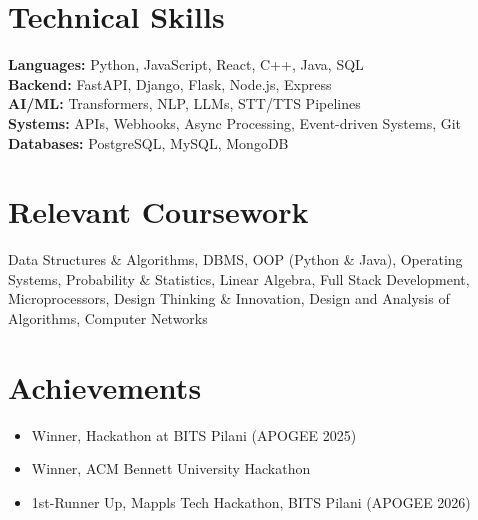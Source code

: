 \documentclass[a4paper,9pt]{article}
\begin{document}
\section*{Technical Skills}

\textbf{Languages:} Python, JavaScript, React, C++, Java, SQL \\
\textbf{Backend:} FastAPI, Django, Flask, Node.js, Express \\
\textbf{AI/ML:} Transformers, NLP, LLMs, STT/TTS Pipelines \\
\textbf{Systems:} APIs, Webhooks, Async Processing, Event-driven Systems, Git \\
\textbf{Databases:} PostgreSQL, MySQL, MongoDB \\

\vspace{5pt}

\section*{Relevant Coursework}

Data Structures \& Algorithms, DBMS, OOP (Python \& Java), Operating Systems, Probability \& Statistics, Linear Algebra, Full Stack Development, Microprocessors, Design Thinking \& Innovation, Design and Analysis of Algorithms, Computer Networks

\vspace{5pt}

\section*{Achievements}

\begin{itemize}[noitemsep, topsep=0pt, leftmargin=*]
    \item Winner, Hackathon at BITS Pilani (APOGEE 2025)
    \item Winner, ACM Bennett University Hackathon
    \item 1st-Runner Up, Mappls Tech Hackathon, BITS Pilani (APOGEE 2026)
\end{itemize}
\end{document}
